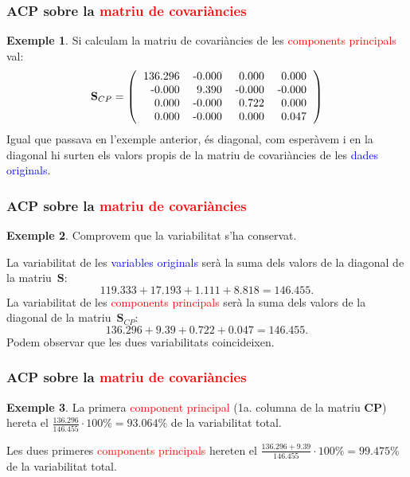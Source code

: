 \documentclass[12pt,t]{beamer}
\newcommand{\red}[1]{\textcolor{red}{#1}}
\newcommand{\blue}[1]{\textcolor{blue}{#1}}
\theoremstyle{plain}
\theoremstyle{definition}
\newtheorem{exemple}{Exemple}
\begin{document}
\begin{frame}
\frametitle{ACP sobre la \red{matriu de covariàncies}}
\begin{exemple}
Si calculam la matriu de covariàncies de les \red{components principals} val:
\[
\mathbf{S}_{CP}=\left(
\begin{tabular}{rrrr}
  136.296 & -0.000 & 0.000 & 0.000 \\ 
  -0.000 & 9.390 & -0.000 & -0.000 \\ 
  0.000 & -0.000 & 0.722 & 0.000 \\ 
  0.000 & -0.000 & 0.000 & 0.047 \\ 
  \end{tabular}\right)
\]
Igual que passava en l'exemple anterior, és diagonal, com esperàvem i en la diagonal hi surten els valors propis de la matriu de covariàncies de les \blue{dades originals.}
\end{exemple}
\end{frame}


\begin{frame}
\frametitle{ACP sobre la \red{matriu de covariàncies}}
\begin{exemple}
Comprovem que la variabilitat s'ha conservat. 
\medskip

La variabilitat de les \blue{variables originals} serà la suma dels valors de la diagonal de la matriu~$\mathbf{S}$:
\[
119.333 + 17.193 + 
1.111 + 8.818 = 146.455.
\]
La variabilitat de les \red{components principals} serà la suma dels valors de la diagonal de la matriu~$\mathbf{S}_{CP}$:
\[
136.296 + 9.39 + 0.722 +0.047= 146.455.
\]
Podem observar que les dues variabilitats coincideixen.
\end{exemple}
\end{frame}

\begin{frame}
\frametitle{ACP sobre la \red{matriu de covariàncies}}
\begin{exemple}

La primera \red{component principal} (1a. columna de la matriu $\mathbf{CP}$) hereta el $\frac{136.296}{146.455}\cdot 100\% = 
93.064\%$ de la variabilitat total.

Les dues primeres \red{components principals} hereten el 
$\frac{136.296 + 9.39}{146.455}\cdot 100\% = 
99.475\%$ de la variabilitat total.
\end{exemple}
\end{frame}
\end{document}
